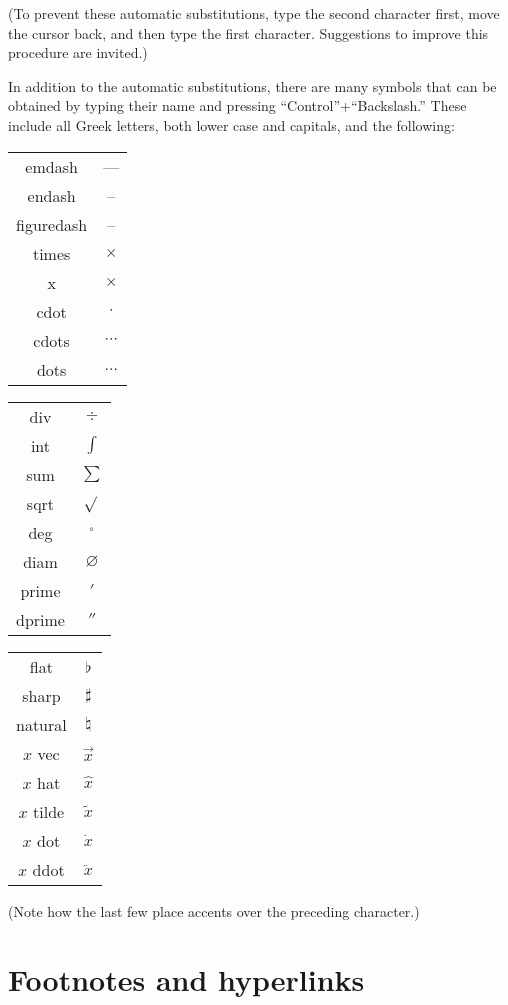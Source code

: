 \documentclass[11pt]{report}
\begin{document}
(To prevent these automatic substitutions, type the second character
first, move the cursor back, and then type the first
character. Suggestions to improve this procedure are invited.)

In addition to the automatic substitutions, there are many symbols
that can be obtained by typing their name and pressing
``Control''+``Backslash.'' These include all Greek letters, both
lower case and capitals, and the following:

\begin{multicols}{3}
\begin{tabular}{cc}
emdash & --- \\
endash & -- \\
figuredash & -- \\
times & $\times$ \\
x & $\times$ \\
cdot & $\cdot$ \\
cdots & $\cdots$ \\
dots & $\ldots$ \\
\end{tabular}

\begin{tabular}{cc}
div & $\div$ \\
int & $\int$ \\
sum & $\sum$ \\
sqrt & $\sqrt{}$ \\
deg & $^\circ$ \\
diam & $\diameter$ \\
prime & $'$ \\
dprime & $''$ 
\end{tabular}

\begin{tabular}{cc}
flat & $\flat$ \\
sharp & $\sharp$ \\
natural & $\natural$ \\
$x$ vec & $\vec x$ \\
$x$ hat & $\hat x$ \\
$x$ tilde & $\tilde x$ \\
$x$ dot & $\dot x$ \\
$x$ ddot & $\ddot x$ \\
\end{tabular}
\end{multicols}

(Note how the last few place accents over the preceding character.)

\section{Footnotes and hyperlinks}
\end{document}
